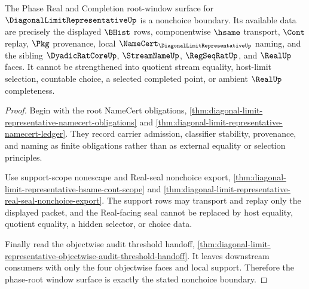\begin{theorem}
\label{thm:diagonal-limit-representative-phase-root-nonchoice-boundary}
The Phase Real and Completion root-window surface for $\DiagonalLimitRepresentativeUp$ is a nonchoice boundary. Its available data are precisely the displayed $\BHist$ rows, componentwise $\hsame$ transport, $\Cont$ replay, $\Pkg$ provenance, local $\NameCert_{\DiagonalLimitRepresentativeUp}$ naming, and the sibling $\DyadicRatCoreUp$, $\StreamNameUp$, $\RegSeqRatUp$, and $\RealUp$ faces. It cannot be strengthened into quotient stream equality, host-limit selection, countable choice, a selected completed point, or ambient $\RealUp$ completeness.
\end{theorem}
\begin{proof}
Begin with the root NameCert obligations, \autoref{thm:diagonal-limit-representative-namecert-obligations} and \autoref{thm:diagonal-limit-representative-namecert-ledger}. They record carrier admission, classifier stability, provenance, and naming as finite obligations rather than as external equality or selection principles.

Use support-scope nonescape and Real-seal nonchoice export, \autoref{thm:diagonal-limit-representative-hsame-cont-scope} and \autoref{thm:diagonal-limit-representative-real-seal-nonchoice-export}. The support rows may transport and replay only the displayed packet, and the Real-facing seal cannot be replaced by host equality, quotient equality, a hidden selector, or choice data.

Finally read the objectwise audit threshold handoff, \autoref{thm:diagonal-limit-representative-objectwise-audit-threshold-handoff}. It leaves downstream consumers with only the four objectwise faces and local support. Therefore the phase-root window surface is exactly the stated nonchoice boundary.
\end{proof}

